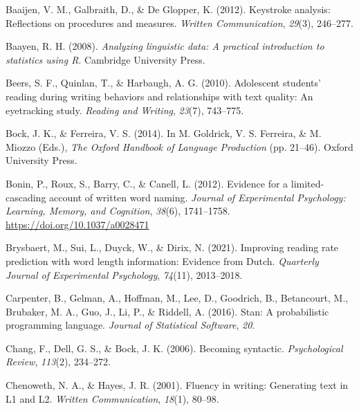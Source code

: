 \documentclass[
  man,floatsintext]{apa7}
\newlength{\cslhangindent}
\newlength{\cslentryspacingunit} %
\newenvironment{CSLReferences}[2] %
 {%
  \setlength{\parindent}{0pt}
  \ifodd #1
  \let\oldpar\par
  \def\par{\hangindent=\cslhangindent\oldpar}
  \fi
  \setlength{\parskip}{#2\cslentryspacingunit}
 }%
 {}
\begin{document}
\begin{CSLReferences}{1}{0}
\leavevmode{}%
Baaijen, V. M., Galbraith, D., \& De Glopper, K. (2012). Keystroke analysis: Reflections on procedures and measures. \emph{Written Communication}, \emph{29}(3), 246--277.

\leavevmode{}%
Baayen, R. H. (2008). \emph{Analyzing linguistic data: A practical introduction to statistics using {R}}. Cambridge University Press.

\leavevmode{}%
Beers, S. F., Quinlan, T., \& Harbaugh, A. G. (2010). Adolescent students' reading during writing behaviors and relationships with text quality: An eyetracking study. \emph{Reading and Writing}, \emph{23}(7), 743--775.

\leavevmode{}%
Bock, J. K., \& Ferreira, V. S. (2014). In M. Goldrick, V. S. Ferreira, \& M. Miozzo (Eds.), \emph{{The Oxford Handbook of Language Production}} (pp. 21--46). Oxford University Press.

\leavevmode{}%
Bonin, P., Roux, S., Barry, C., \& Canell, L. (2012). Evidence for a limited-cascading account of written word naming. \emph{Journal of Experimental Psychology: Learning, Memory, and Cognition}, \emph{38}(6), 1741--1758. \url{https://doi.org/10.1037/a0028471}

\leavevmode{}%
Brysbaert, M., Sui, L., Duyck, W., \& Dirix, N. (2021). Improving reading rate prediction with word length information: Evidence from {D}utch. \emph{Quarterly Journal of Experimental Psychology}, \emph{74}(11), 2013--2018.

\leavevmode{}%
Carpenter, B., Gelman, A., Hoffman, M., Lee, D., Goodrich, B., Betancourt, M., Brubaker, M. A., Guo, J., Li, P., \& Riddell, A. (2016). Stan: A probabilistic programming language. \emph{Journal of Statistical Software}, \emph{20}.

\leavevmode{}%
Chang, F., Dell, G. S., \& Bock, J. K. (2006). Becoming syntactic. \emph{Psychological Review}, \emph{113}(2), 234--272.

\leavevmode{}%
Chenoweth, N. A., \& Hayes, J. R. (2001). Fluency in writing: Generating text in {L1} and {L2}. \emph{Written Communication}, \emph{18}(1), 80--98.


\end{CSLReferences}
\end{document}
